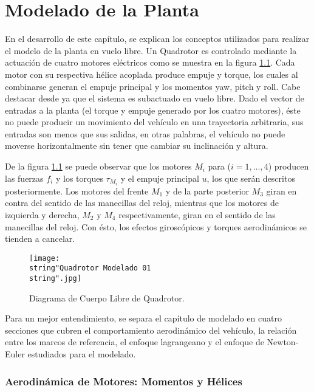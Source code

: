 \documentclass[../main.tex]{subfiles}
\begin{document}
\chapter{Modelado de la Planta}\label{Modelado de la Planta}

En el desarrollo de este capítulo, se explican los conceptos utilizados
para realizar el modelo de la planta en vuelo libre. Un Quadrotor es controlado mediante
la actuación de cuatro motores eléctricos como se muestra en la figura
\ref{fig:Diagrama-de-Cuerpo }. Cada motor con su respectiva hélice
acoplada produce empuje y torque, los cuales al combinarse generan
el empuje principal y los momentos yaw, pitch y roll. Cabe destacar
desde ya que el sistema es subactuado en vuelo libre. Dado el vector de entradas
a la planta (el torque y empuje generado por los cuatro motores),
éste no puede producir un movimiento del vehículo en una trayectoria
arbitraria, sus entradas son menos que sus salidas, en otras palabras,
el vehículo no puede moverse horizontalmente sin tener que cambiar
su inclinación y altura. 

De la figura \ref{fig:Diagrama-de-Cuerpo } se puede observar que
los motores $M_{i}$ para ($i=1,...,4$) producen las fuerzas $f_{i}$
y los torques $\tau_{M_{i}}$ y el empuje principal $u$, los que serán
descritos posteriormente. Los motores del frente $M_{1}$ y de la
parte posterior $M_{3}$ giran en contra del sentido de las manecillas
del reloj, mientras que los motores de izquierda y derecha, $M_{2}$ y
$M_{4}$ respectivamente, giran en el sentido de las manecillas del
reloj. Con ésto, los efectos giroscópicos y torques aerodinámicos
se tienden a cancelar.

\begin{figure}[H]
\noindent \begin{centering}
\texttt{[image: \\string"Quadrotor Modelado 01\\string".jpg]}
\par\end{centering}
\caption{\label{fig:Diagrama-de-Cuerpo }Diagrama de Cuerpo Libre de Quadrotor.}
\end{figure}

\textcompwordmark{}

Para un mejor entendimiento, se separa el capítulo de modelado en
cuatro secciones que cubren el comportamiento aerodinámico del vehículo,
la relación entre los marcos de referencia, el enfoque lagrangeano y el enfoque de Newton-Euler estudiados para el modelado.


\subsection{Aerodinámica de Motores: Momentos y Hélices}
\end{document}
